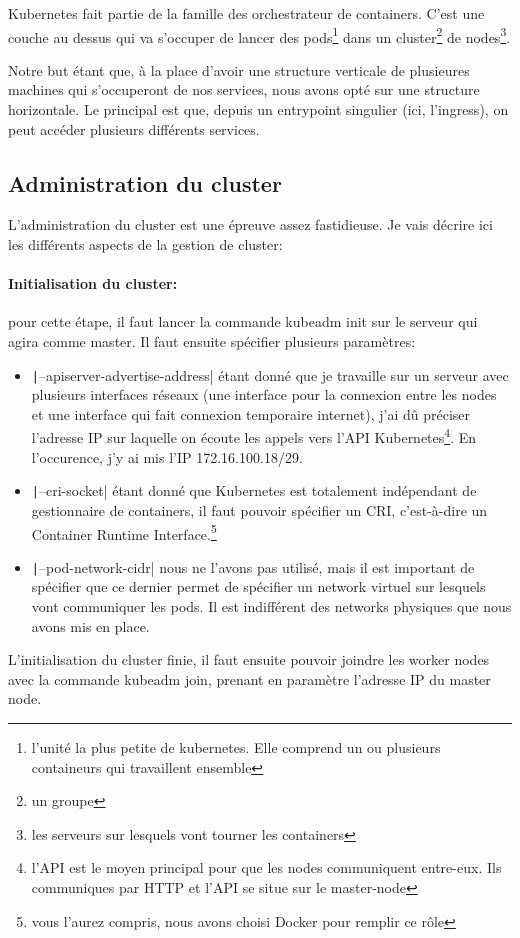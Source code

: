Kubernetes fait partie de la famille des orchestrateur de containers. C'est une couche au dessus qui va s'occuper de lancer  des pods\footnote{l'unité la plus petite de kubernetes. Elle comprend un ou plusieurs containeurs qui travaillent ensemble} dans un cluster\footnote{un groupe} de nodes\footnote{les serveurs sur lesquels vont tourner les containers}.

Notre but étant que, à la place d'avoir une structure verticale de plusieures machines qui s'occuperont de nos services, nous avons opté sur une structure horizontale. Le principal est que, depuis un entrypoint singulier (ici, l'ingress), on peut accéder plusieurs différents services.

\subsection{Administration du cluster}

L'administration du cluster est une épreuve assez fastidieuse. Je vais décrire ici les différents aspects de la gestion de cluster:

\paragraph{Initialisation du cluster:} pour cette étape, il faut lancer la commande kubeadm init sur le serveur qui agira comme master. Il faut ensuite spécifier plusieurs paramètres:
\begin{itemize}
    \item \texttt|--apiserver-advertise-address| étant donné que je travaille sur un serveur avec plusieurs interfaces réseaux (une interface pour la connexion entre les nodes et une interface qui fait connexion temporaire internet), j'ai dû préciser l'adresse IP sur laquelle on écoute les appels vers l'API Kubernetes\footnote{l'API est le moyen principal pour que les nodes communiquent entre-eux. Ils communiques par HTTP et l'API se situe sur le master-node}. En l'occurence, j'y ai mis l'IP 172.16.100.18/29.
    \item \texttt|--cri-socket| étant donné que Kubernetes est totalement indépendant de gestionnaire de containers, il faut pouvoir spécifier un CRI, c'est-à-dire un Container Runtime Interface.\footnote{vous l'aurez compris, nous avons choisi Docker pour remplir ce rôle}
    \item \texttt|--pod-network-cidr| nous ne l'avons pas utilisé, mais il est important de spécifier que ce dernier permet de spécifier un network virtuel sur lesquels vont communiquer les pods. Il est indifférent des networks physiques que nous avons mis en place.
\end{itemize}
L'initialisation du cluster finie, il faut ensuite pouvoir joindre les worker nodes avec la commande kubeadm join, prenant en paramètre l'adresse IP du master node.

